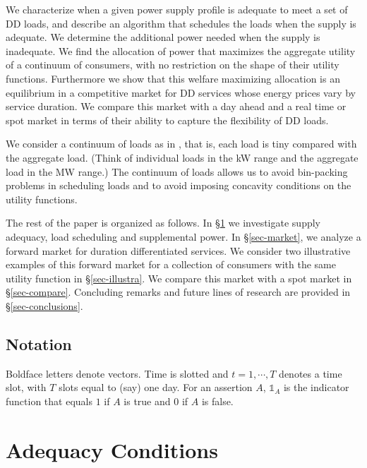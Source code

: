 \documentclass[10pt,draftcls,onecolumn]{IEEEtran}
\newcounter{l1}
\newcounter{l2}
\newcounter{l3}
\begin{document}
We  characterize when a given power supply profile  is adequate to meet a set of DD loads, and describe an algorithm that schedules the loads when the supply is adequate. We  determine the additional power needed when the supply is inadequate.  We find the  allocation of power that maximizes the aggregate utility of a continuum of consumers, with no restriction on the shape of their utility functions.  Furthermore we show that this welfare maximizing allocation is an equilibrium in a competitive market for DD services whose  energy prices  vary by  service duration.  We compare this market with a day ahead and a real time or spot market in terms of their ability to capture the flexibility of DD loads.

We consider  a continuum of loads as in  \cite{tanvar93}, that is, each load is tiny compared with the aggregate load.  (Think of individual loads in the kW range and the aggregate load in the MW range.)  The  continuum of loads allows us to avoid bin-packing problems in scheduling loads and to avoid imposing  concavity conditions on the utility functions.

The rest of the paper is organized as follows. In \S \ref{sec-adequacy} we investigate supply adequacy, load scheduling and supplemental power. In \S \ref{sec-market},  we analyze a forward market for duration differentiated services. We consider two illustrative examples of this forward market for a collection of consumers with the same  utility function in \S \ref{sec-illustra}.  We compare this market with a spot market in \S \ref{sec-compare}.  Concluding remarks and future lines of research are provided in \S \ref{sec-conclusions}.

\subsection*{Notation}

Boldface letters denote vectors.  Time is slotted and $t=1, \cdots, T$ denotes a time slot, with $T$ slots equal to (say) one day.   For an assertion $A$, $\mathds{1}_{A}$ is the indicator function that equals $1$ if $A$ is true and $0$ if $A$ is false. 

















\section{Adequacy Conditions}\label{sec-adequacy}
\end{document}
